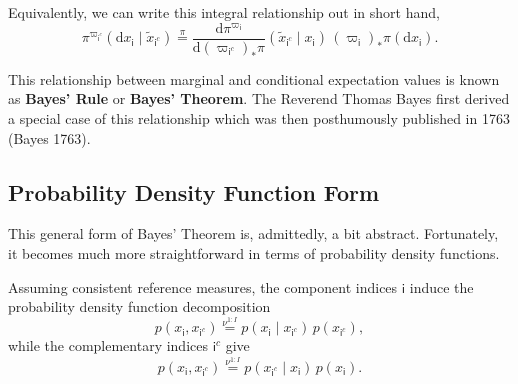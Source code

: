 \documentclass[
  letterpaper,
  DIV=11,
  numbers=noendperiod]{scrartcl}
\begin{document}
Equivalently, we can write this integral relationship out in short hand,
\[
\pi^{ \varpi_{ \mathsf{i}^{c} } } (
  \mathrm{d} x_{ \mathsf{i} } \mid
  \tilde{x}_{ \mathsf{i}^{c} }
)
\overset{ \pi }{=}
\frac{
  \mathrm{d} \pi^{ \varpi_{\mathsf{i}} }
}{
  \mathrm{d} ( \varpi_{ \mathsf{i}^{c} } )_{*} \pi
}
( \tilde{x}_{ \mathsf{i}^{c} } \mid
  x_{\mathsf{i}}
) \,
( \varpi_{ \mathsf{i} } )_{*} \pi (
  \mathrm{d} x_{ \mathsf{i} } ).
\]

This relationship between marginal and conditional expectation values is
known as \textbf{Bayes' Rule} or \textbf{Bayes' Theorem}. The Reverend
Thomas Bayes first derived a special case of this relationship which was
then posthumously published in 1763 (Bayes 1763).

\subsection{Probability Density Function
Form}\label{probability-density-function-form}

This general form of Bayes' Theorem is, admittedly, a bit abstract.
Fortunately, it becomes much more straightforward in terms of
probability density functions.

Assuming consistent reference measures, the component indices
\(\mathsf{i}\) induce the probability density function decomposition \[
p( x_{\mathsf{i}}, x_{ \mathsf{i}^{c} } )
\overset{ \nu^{1:I} }{=}
p( x_{\mathsf{i}} \mid x_{ \mathsf{i}^{c} } ) \,
p( x_{ \mathsf{i}^{c} } ),
\] while the complementary indices \(\mathsf{i}^{c}\) give \[
p( x_{\mathsf{i}}, x_{ \mathsf{i}^{c} } )
\overset{ \nu^{1:I} }{=}
p( x_{ \mathsf{i}^{c} } \mid x_{\mathsf{i}}) \,
p( x_{ \mathsf{i} } ).
\]
\end{document}
